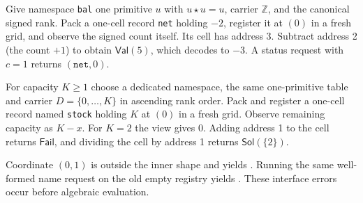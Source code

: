 Give namespace \texttt{bal} one primitive $u$ with $u\star u=u$, carrier $\mathbb Z$, and the canonical signed rank. Pack a one-cell record \texttt{net} holding $-2$, register it at $(0)$ in a fresh grid, and observe the signed count itself. Its cell has address 3. Subtract address 2 (the count $+1$) to obtain $\mathsf{Val}(5)$, which decodes to $-3$. A status request with $c=1$ returns $(\texttt{net},0)$.

For capacity $K\ge1$ choose a dedicated namespace, the same one-primitive table and carrier $D=\{0,\ldots,K\}$ in ascending rank order. Pack and register a one-cell record named \texttt{stock} holding $K$ at $(0)$ in a fresh grid. Observe remaining capacity as $K-x$. For $K=2$ the view gives 0. Adding address 1 to the cell returns $\mathsf{Fail}$, and dividing the cell by address 1 returns $\mathsf{Sol}(\{2\})$.

Coordinate $(0,1)$ is outside the inner shape and yields . Running the same well-formed name request on the old empty registry yields . These interface errors occur before algebraic evaluation.
\endgroup
